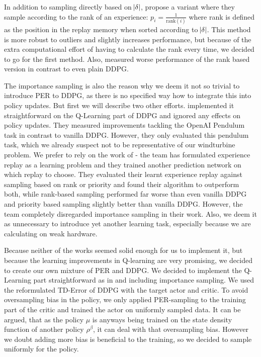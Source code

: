 \documentclass[hyperref,beleg]{cgvpub}
\begin{document}
In addition to sampling directly based on $\abs{\delta}$, \cite{schaulPrioritizedExperienceReplay2016} propose a variant where they sample according to the rank of an experience: $p_i = \frac{1}{\text{rank}(i)}$ where rank is defined as the position in the replay memory when sorted according to $\abs{\delta}$. This method is more robust to outliers and slightly increases performance, but because of the extra computational effort of having to calculate the rank every time, we decided to go for the first method. Also, \cite{zhaExperienceReplayOptimization2019} measured worse performance of the rank based version in contrast to even plain \ac{DDPG}.

The importance sampling is also the reason why we deem it not so trivial to introduce \ac{PER} to \ac{DDPG}, as there is no specified way how to integrate this into policy updates. But first we will describe two other efforts. \cite{houImprovingDDPGPrioritized} implemented it straightforward on the Q-Learning part of \ac{DDPG} and ignored any effects on policy updates. They measured improvements tackling the OpenAI Pendulum task in contrast to vanilla \ac{DDPG}. However, they only evaluated this pendulum task, which we already suspect not to be representative of our windturbine problem. We prefer to rely on the work of \cite{zhaExperienceReplayOptimization2019} - the team has formulated experience replay as a learning problem and they trained another prediction network on which replay to choose. They evaluated their learnt experience replay against sampling based on rank or priority and found their algorithm to outperform both, while rank-based sampling performed far worse than even vanilla \ac{DDPG} and priority based sampling slightly better than vanilla \ac{DDPG}. However, the team completely disregarded importance sampling in their work. Also, we deem it as unnecessary to introduce yet another learning task, especially because we are calculating on weak hardware.

Because neither of the works seemed solid enough for us to implement it, but because the learning improvements in Q-learning are very promising, we decided to create our own mixture of \ac{PER} and \ac{DDPG}. We decided to implement the Q-Learning part straightforward as in \cite{schaulPrioritizedExperienceReplay2016} and including importance sampling. We used the reformulated \ac{TD-Error} of \ac{DDPG} with the target actor and critic. To avoid oversampling bias in the policy, we only applied \ac{PER}-sampling to the training part of the critic and trained the actor on uniformly sampled data. It can be argued, that as the policy $\mu$ is anyways being trained on the state density function of another policy $\rho^{\beta}$, it can deal with that oversampling bias. However we doubt adding more bias is beneficial to the training, so we decided to sample uniformly for the policy.
\end{document}
